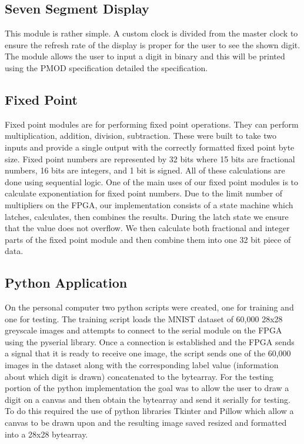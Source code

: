 \documentclass[11pt]{article}
\begin{document}
\subsection{Seven Segment Display}
This module is rather simple. A custom clock is divided from the master clock to ensure the refresh rate of the display is proper for the user to see the shown digit. The module allows the user to input a digit in binary and this will be printed using the PMOD specification detailed the specification.

\subsection{Fixed Point}
Fixed point modules are for performing fixed point operations. They can perform multiplication, addition, division, subtraction. These were built to take two inputs and provide a single output with the correctly formatted fixed point byte size. Fixed point numbers are represented by 32 bits where 15 bits are fractional numbers, 16 bits are integers, and 1 bit is signed. All of these calculations are done using sequential logic. One of the main uses of our fixed point modules is to calculate exponentiation for fixed point numbers. Due to the limit number of multipliers on the FPGA, our implementation consists of a state machine which latches, calculates, then combines the results. During the latch state we ensure that the value does not overflow. We then calculate both fractional and integer parts of the fixed point module and then combine them into one 32 bit piece of data.

\subsection{Python Application}
On the personal computer two python scripts were created, one for training and one for testing. The training script loads the MNIST dataset of 60,000 28x28 greyscale images and attempts to connect to the serial module on the FPGA using the pyserial library. Once a connection is established and the FPGA sends a signal that it is ready to receive one image, the script sends one of the 60,000 images in the dataset along with the corresponding label value (information about which digit is drawn) concatenated to the bytearray. 
For the testing portion of the python implementation the goal was to allow the user to draw a digit on a canvas and then obtain the bytearray and send it serially for testing. To do this required the use of python libraries Tkinter and Pillow which allow a canvas to be drawn upon and the resulting image saved resized and formatted into a 28x28 bytearray.
\end{document}
